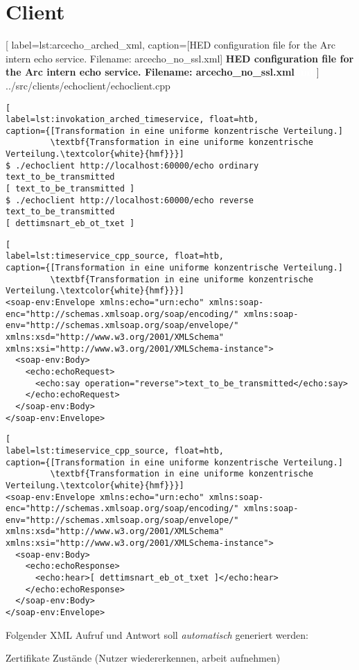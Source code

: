 \section{Client}



	[
	label=lst:arcecho_arched_xml,
	caption={[HED configuration file for the Arc intern echo service. Filename: arcecho\_no\_ssl.xml]
	\textbf{HED configuration file for the Arc intern echo service. Filename: arcecho\_no\_ssl.xml\textcolor{white}{hmf}}}
	]
{../src/clients/echoclient/echoclient.cpp}





\begin{lstlisting}[
label=lst:invokation_arched_timeservice, float=htb,
caption={[Transformation in eine uniforme konzentrische Verteilung.]
         \textbf{Transformation in eine uniforme konzentrische Verteilung.\textcolor{white}{hmf}}}]
$ ./echoclient http://localhost:60000/echo ordinary text_to_be_transmitted
[ text_to_be_transmitted ]
$ ./echoclient http://localhost:60000/echo reverse text_to_be_transmitted
[ dettimsnart_eb_ot_txet ]
\end{lstlisting}





\begin{lstlisting}[
label=lst:timeservice_cpp_source, float=htb,
caption={[Transformation in eine uniforme konzentrische Verteilung.]
         \textbf{Transformation in eine uniforme konzentrische Verteilung.\textcolor{white}{hmf}}}]
<soap-env:Envelope xmlns:echo="urn:echo" xmlns:soap-enc="http://schemas.xmlsoap.org/soap/encoding/" xmlns:soap-env="http://schemas.xmlsoap.org/soap/envelope/" xmlns:xsd="http://www.w3.org/2001/XMLSchema" xmlns:xsi="http://www.w3.org/2001/XMLSchema-instance">
  <soap-env:Body>
    <echo:echoRequest>
      <echo:say operation="reverse">text_to_be_transmitted</echo:say>
    </echo:echoRequest>
  </soap-env:Body>
</soap-env:Envelope>
\end{lstlisting}



\begin{lstlisting}[
label=lst:timeservice_cpp_source, float=htb,
caption={[Transformation in eine uniforme konzentrische Verteilung.]
         \textbf{Transformation in eine uniforme konzentrische Verteilung.\textcolor{white}{hmf}}}]
<soap-env:Envelope xmlns:echo="urn:echo" xmlns:soap-enc="http://schemas.xmlsoap.org/soap/encoding/" xmlns:soap-env="http://schemas.xmlsoap.org/soap/envelope/" xmlns:xsd="http://www.w3.org/2001/XMLSchema" xmlns:xsi="http://www.w3.org/2001/XMLSchema-instance">
  <soap-env:Body>
    <echo:echoResponse>
      <echo:hear>[ dettimsnart_eb_ot_txet ]</echo:hear>
    </echo:echoResponse>
  </soap-env:Body>
</soap-env:Envelope>
\end{lstlisting}









Folgender XML Aufruf und Antwort soll \textit{automatisch} generiert werden:






Zertifikate
Zustände (Nutzer wiedererkennen, arbeit aufnehmen)
